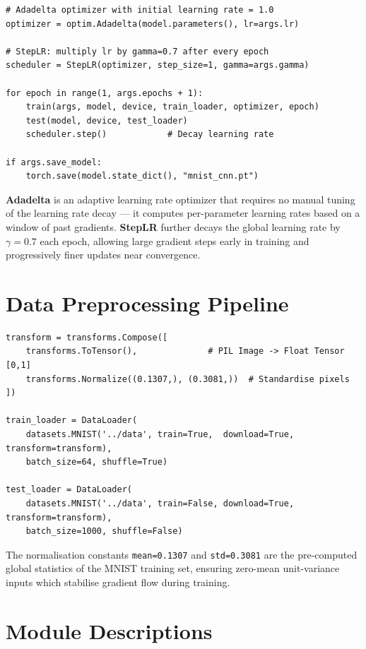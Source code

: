 \documentclass[12pt,a4paper,openany]{report}
\begin{document}
\begin{verbatim}
# Adadelta optimizer with initial learning rate = 1.0
optimizer = optim.Adadelta(model.parameters(), lr=args.lr)

# StepLR: multiply lr by gamma=0.7 after every epoch
scheduler = StepLR(optimizer, step_size=1, gamma=args.gamma)

for epoch in range(1, args.epochs + 1):
    train(args, model, device, train_loader, optimizer, epoch)
    test(model, device, test_loader)
    scheduler.step()            # Decay learning rate

if args.save_model:
    torch.save(model.state_dict(), "mnist_cnn.pt")
\end{verbatim}

\textbf{Adadelta} is an adaptive learning rate optimizer that requires no manual tuning of the learning rate decay --- it computes per-parameter learning rates based on a window of past gradients. \textbf{StepLR} further decays the global learning rate by $\gamma = 0.7$ each epoch, allowing large gradient steps early in training and progressively finer updates near convergence.

\section{Data Preprocessing Pipeline}

\begin{verbatim}
transform = transforms.Compose([
    transforms.ToTensor(),              # PIL Image -> Float Tensor [0,1]
    transforms.Normalize((0.1307,), (0.3081,))  # Standardise pixels
])

train_loader = DataLoader(
    datasets.MNIST('../data', train=True,  download=True, transform=transform),
    batch_size=64, shuffle=True)

test_loader = DataLoader(
    datasets.MNIST('../data', train=False, download=True, transform=transform),
    batch_size=1000, shuffle=False)
\end{verbatim}

The normalisation constants \texttt{mean=0.1307} and \texttt{std=0.3081} are the pre-computed global statistics of the MNIST training set, ensuring zero-mean unit-variance inputs which stabilise gradient flow during training.

\section{Module Descriptions}
\end{document}
